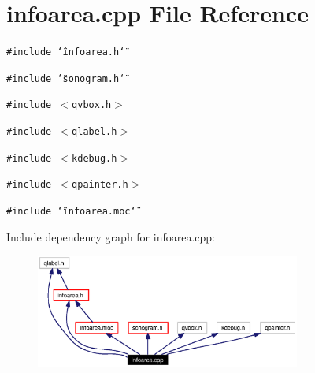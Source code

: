\section{infoarea.cpp File Reference}
\label{infoarea_8cpp}


{\tt \#include \char`\"{}infoarea.h\char`\"{}}\par
{\tt \#include \char`\"{}sonogram.h\char`\"{}}\par
{\tt \#include $<$qvbox.h$>$}\par
{\tt \#include $<$qlabel.h$>$}\par
{\tt \#include $<$kdebug.h$>$}\par
{\tt \#include $<$qpainter.h$>$}\par
{\tt \#include \char`\"{}infoarea.moc\char`\"{}}\par


Include dependency graph for infoarea.cpp:\begin{figure}[H]
\begin{center}
\leavevmode
\includegraphics[width=247pt]{infoarea_8cpp__incl}
\end{center}
\end{figure}

